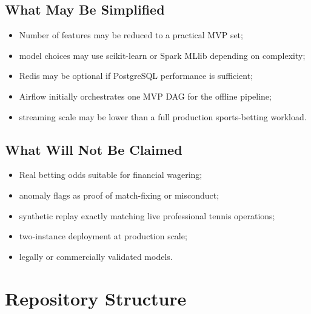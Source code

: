 \documentclass[11pt,a4paper]{article}
\begin{document}
\subsection{What May Be Simplified}

\begin{itemize}[nosep]
  \item Number of features may be reduced to a practical MVP set;
  \item model choices may use scikit-learn or Spark MLlib depending on complexity;
  \item Redis may be optional if PostgreSQL performance is sufficient;
  \item Airflow initially orchestrates one MVP DAG for the offline pipeline;
  \item streaming scale may be lower than a full production sports-betting workload.
\end{itemize}

\subsection{What Will Not Be Claimed}

\begin{itemize}[nosep]
  \item Real betting odds suitable for financial wagering;
  \item anomaly flags as proof of match-fixing or misconduct;
  \item synthetic replay exactly matching live professional tennis operations;
  \item two-instance deployment at production scale;
  \item legally or commercially validated models.
\end{itemize}

\section{Repository Structure}
\end{document}
